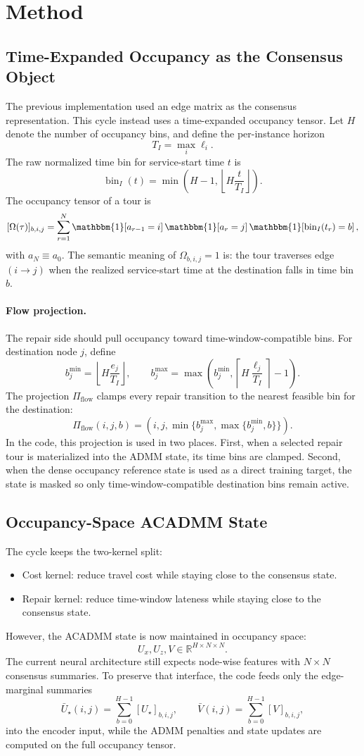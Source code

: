 \documentclass{article}
\begin{document}
\section{Method}
\subsection{Time-Expanded Occupancy as the Consensus Object}
The previous implementation used an edge matrix as the consensus representation. This cycle instead uses a time-expanded occupancy tensor. Let $H$ denote the number of occupancy bins, and define the per-instance horizon
\[
T_I = \max_{i}\ell_i.
\]
The raw normalized time bin for service-start time $t$ is
\[
\operatorname{bin}_I(t)=\min\!\left(H-1,\left\lfloor H\frac{t}{T_I}\right\rfloor\right).
\]
The occupancy tensor of a tour is
\[
[\Omega(\tau)]_{b,i,j}
=
\sum_{r=1}^{N}
\mathbbm{1}[a_{r-1}=i]\,
\mathbbm{1}[a_r=j]\,
\mathbbm{1}\!\left[\operatorname{bin}_I(t_r)=b\right],
\]
with $a_N\equiv a_0$. The semantic meaning of $\Omega_{b,i,j}=1$ is: the tour traverses edge $(i\!\to\! j)$ when the realized service-start time at the destination falls in time bin $b$.

\paragraph{Flow projection.}
The repair side should pull occupancy toward time-window-compatible bins. For destination node $j$, define
\[
b_j^{\min}=\left\lfloor H\frac{e_j}{T_I}\right\rfloor,
\qquad
b_j^{\max}=\max\!\left(b_j^{\min},\left\lceil H\frac{\ell_j}{T_I}\right\rceil-1\right).
\]
The projection $\Pi_{\mathrm{flow}}$ clamps every repair transition to the nearest feasible bin for the destination:
\[
\Pi_{\mathrm{flow}}(i,j,b)=\left(i,j,\min\{b_j^{\max},\max\{b_j^{\min},b\}\}\right).
\]
In the code, this projection is used in two places. First, when a selected repair tour is materialized into the ADMM state, its time bins are clamped. Second, when the dense occupancy reference state is used as a direct training target, the state is masked so only time-window-compatible destination bins remain active.

\subsection{Occupancy-Space ACADMM State}
The cycle keeps the two-kernel split:
\begin{itemize}
\item Cost kernel: reduce travel cost while staying close to the consensus state.
\item Repair kernel: reduce time-window lateness while staying close to the consensus state.
\end{itemize}
However, the ACADMM state is now maintained in occupancy space:
\[
U_x,U_z,V \in \mathbb{R}^{H\times N\times N}.
\]
The current neural architecture still expects node-wise features with $N\times N$ consensus summaries. To preserve that interface, the code feeds only the edge-marginal summaries
\[
\bar U_\star(i,j)=\sum_{b=0}^{H-1}[U_\star]_{b,i,j},
\qquad
\bar V(i,j)=\sum_{b=0}^{H-1}[V]_{b,i,j},
\]
into the encoder input, while the ADMM penalties and state updates are computed on the full occupancy tensor.
\end{document}
